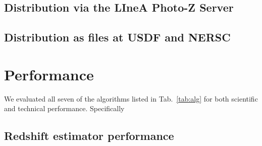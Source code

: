 \subsection{Distribution via the LIneA Photo-Z Server}
\label{sec:distribution:linea}


\subsection{Distribution as files at USDF and NERSC}
\label{sec:distribution:files}



\section{Performance}
\label{sec:performance:0}

We evaluated all seven of the algorithms listed in Tab.~\ref{tab:alg} for both scientific and technical performance.   Specifically 

\subsection{Redshift estimator performance}
\label{sec: performance:pz}


